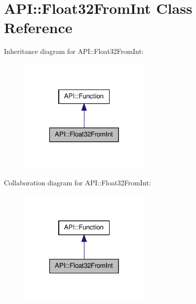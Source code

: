 \hypertarget{class_a_p_i_1_1_float32_from_int}{\section{A\-P\-I\-:\-:Float32\-From\-Int Class Reference}
\label{class_a_p_i_1_1_float32_from_int}
}


Inheritance diagram for A\-P\-I\-:\-:Float32\-From\-Int\-:\nopagebreak
\begin{figure}[H]
\begin{center}
\leavevmode
\includegraphics[width=184pt]{class_a_p_i_1_1_float32_from_int__inherit__graph}
\end{center}
\end{figure}


Collaboration diagram for A\-P\-I\-:\-:Float32\-From\-Int\-:\nopagebreak
\begin{figure}[H]
\begin{center}
\leavevmode
\includegraphics[width=184pt]{class_a_p_i_1_1_float32_from_int__coll__graph}
\end{center}
\end{figure}
